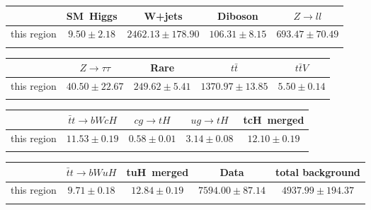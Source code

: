 \centering
\begin{tabular}{ccccc} \toprule\toprule
 & SM~Higgs & W+jets & Diboson & $Z\to ll$\\\midrule
this region & $9.50\pm2.18$ & $2462.13\pm178.90$ & $106.31\pm8.15$ & $693.47\pm70.49$\\
\bottomrule\bottomrule\\
\end{tabular}
\begin{tabular}{ccccc} \toprule\toprule
 & $Z\to \tau\tau$ & Rare & $t\bar{t}$ & $t\bar{t}V$\\\midrule
this region & $40.50\pm22.67$ & $249.62\pm5.41$ & $1370.97\pm13.85$ & $5.50\pm0.14$\\
\bottomrule\bottomrule\\
\end{tabular}
\begin{tabular}{ccccc} \toprule\toprule
 & $\bar{t}t\to bWcH$ & $cg\to tH$ & $ug\to tH$ & tcH~merged\\\midrule
this region & $11.53\pm0.19$ & $0.58\pm0.01$ & $3.14\pm0.08$ & $12.10\pm0.19$\\
\bottomrule\bottomrule\\
\end{tabular}
\begin{tabular}{ccccc} \toprule\toprule
 & $\bar{t}t\to bWuH$ & tuH~merged & Data & total background\\\midrule
this region & $9.71\pm0.18$ & $12.84\pm0.19$ & $7594.00\pm87.14$ & $4937.99\pm194.37$\\
\bottomrule\bottomrule\\
\end{tabular}
